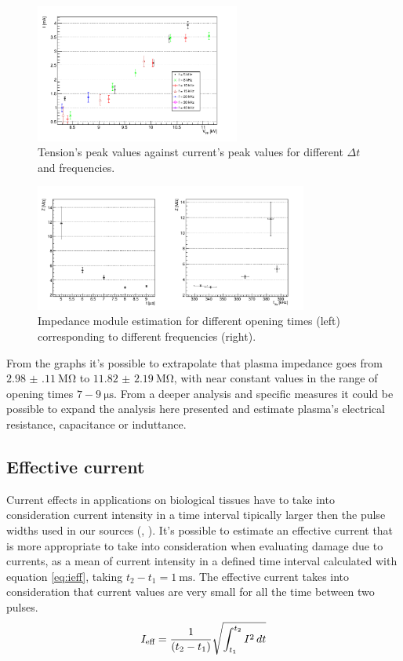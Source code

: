 \begin{figure}
 \centering
 \includegraphics[width=0.6\textwidth]{Images/Electric/VI_B.png}
 \caption{Tension's peak values against current's peak values for different $\Delta t$ and frequencies.}
 \label{fig:viplot}
\end{figure}

\begin{figure}
 \centering
 \includegraphics[width=0.8\textwidth]{Images/Electric/z_f8.png}
 \caption{Impedance module estimation for different opening times (left) corresponding to different frequencies (right).}
 \label{fig:zest}
\end{figure}

From the graphs it's possible to extrapolate that plasma impedance goes from $\SI{2.98(11)}{\mega\ohm}$ to $\SI{11.82(219)}{\mega\ohm}$, with near constant values in the range of opening times $7-\SI{9}{\micro\second}$.
From a deeper analysis and specific measures it could be possible to expand the analysis here presented and estimate plasma's electrical resistance, capacitance or induttance.

\subsection{Effective current}
Current effects in applications on biological tissues have to take into consideration current intensity in a time interval tipically larger then the pulse widths used in our sources (\cite{doi:10.1002/ppap.200731208}, \cite{unipd:ceciliaDBD}). It's possible to estimate an effective current that is more appropriate to take into consideration when evaluating damage due to currents, as a mean of current intensity in a defined time interval calculated with equation \ref{eq:ieff}, taking $t_2-t_1 = \SI{1}{\milli\second}$. The effective current takes into consideration that current values are very small for all the time between two pulses.
\begin{equation}
 \centering
 I_{\text{eff}} = \frac{1}{(t_2-t_1)}\sqrt{\int_{t_1}^{t_2} I^2 \,dt}
 \label{eq:ieff}
\end{equation}

